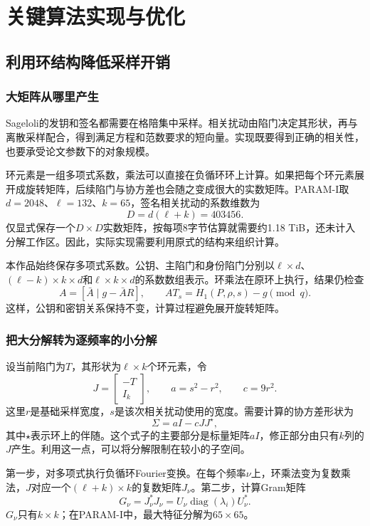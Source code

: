 \chapter{关键算法实现与优化}

\section{利用环结构降低采样开销}
\subsection{大矩阵从哪里产生}
Sageloli的发钥和签名都需要在格陪集中采样。相关扰动由陷门决定其形状，再与离散采样配合，得到满足方程和范数要求的短向量。实现既要得到正确的相关性，也要承受论文参数下的对象规模。

环元素是一组多项式系数，乘法可以直接在负循环环上计算。如果把每个环元素展开成旋转矩阵，后续陷门与协方差也会随之变成很大的实数矩阵。PARAM-I取$d=2048$、$\ell=132$、$k=65$，签名相关扰动的系数维数为
\[
 D=d(\ell+k)=403456.
\]
仅显式保存一个$D\times D$实数矩阵，按每项8字节估算就需要约1.18 TiB，还未计入分解工作区。因此，实际实现需要利用原式的结构来组织计算。

本作品始终保存多项式系数。公钥、主陷门和身份陷门分别以$\ell\times d$、$(\ell-k)\times k\times d$和$\ell\times k\times d$的系数数组表示。环乘法在原环上执行，结果仍检查
\[
 A=[\bar A\mid g-\bar AR],\qquad AT_s=H_1(P,\rho,s)-g\pmod q.
\]
这样，公钥和密钥关系保持不变，计算过程避免展开旋转矩阵。

\subsection{把大分解转为逐频率的小分解}
设当前陷门为$T$，其形状为$\ell\times k$个环元素，令
\[
 J=\begin{bmatrix}-T\\I_k\end{bmatrix},\qquad
 a=s^2-r^2,\qquad c=9r^2.
\]
这里$r$是基础采样宽度，$s$是该次相关扰动使用的宽度。需要计算的协方差形状为
\[
 \Sigma=aI-cJJ^\star,
\]
其中$\star$表示环上的伴随。这个式子的主要部分是标量矩阵$aI$，修正部分由只有$k$列的$J$产生。利用这一点，可以将分解限制在较小的子空间。

第一步，对多项式执行负循环Fourier变换。在每个频率$\nu$上，环乘法变为复数乘法，$J$对应一个$(\ell+k)\times k$的复数矩阵$J_\nu$。第二步，计算Gram矩阵
\[
 G_\nu=J_\nu^*J_\nu
      =U_\nu\operatorname{diag}(\lambda_i)U_\nu^*.
\]
$G_\nu$只有$k\times k$；在PARAM-I中，最大特征分解为$65\times65$。

